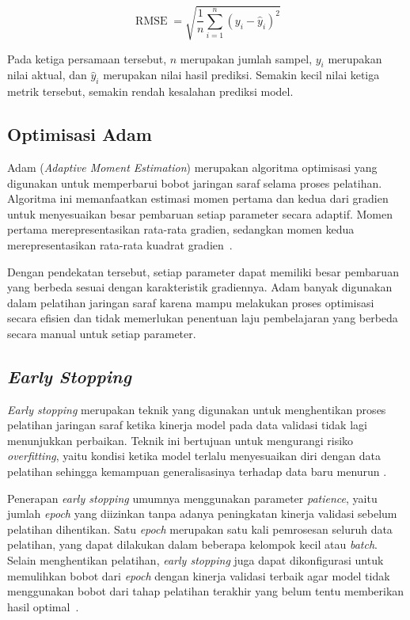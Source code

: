\documentclass[10pt,conference]{IEEEtran}
\begin{document}
\begin{equation}\label{eq:rmse}
\operatorname{RMSE}=\sqrt{\frac{1}{n}\sum_{i=1}^{n}(y_i-\hat{y}_i)^2}
\end{equation}

Pada ketiga persamaan tersebut, \(n\) merupakan jumlah sampel, \(y_i\) merupakan nilai aktual, dan \(\hat{y}_i\) merupakan nilai hasil prediksi. Semakin kecil nilai ketiga metrik tersebut, semakin rendah kesalahan prediksi model.

\subsection{Optimisasi Adam}

Adam (\textit{Adaptive Moment Estimation}) merupakan algoritma optimisasi yang digunakan untuk memperbarui bobot jaringan saraf selama proses pelatihan. Algoritma ini memanfaatkan estimasi momen pertama dan kedua dari gradien untuk menyesuaikan besar pembaruan setiap parameter secara adaptif. Momen pertama merepresentasikan rata-rata gradien, sedangkan momen kedua merepresentasikan rata-rata kuadrat gradien~\cite{adam}.

Dengan pendekatan tersebut, setiap parameter dapat memiliki besar pembaruan yang berbeda sesuai dengan karakteristik gradiennya. Adam banyak digunakan dalam pelatihan jaringan saraf karena mampu melakukan proses optimisasi secara efisien dan tidak memerlukan penentuan laju pembelajaran yang berbeda secara manual untuk setiap parameter.

\subsection{\textit{Early Stopping}}

\textit{Early stopping} merupakan teknik yang digunakan untuk menghentikan proses pelatihan jaringan saraf ketika kinerja model pada data validasi tidak lagi menunjukkan perbaikan. Teknik ini bertujuan untuk mengurangi risiko \textit{overfitting}, yaitu kondisi ketika model terlalu menyesuaikan diri dengan data pelatihan sehingga kemampuan generalisasinya terhadap data baru menurun \cite{early-stopping}.

Penerapan \textit{early stopping} umumnya menggunakan parameter \textit{patience}, yaitu jumlah \textit{epoch} yang diizinkan tanpa adanya peningkatan kinerja validasi sebelum pelatihan dihentikan. Satu \textit{epoch} merupakan satu kali pemrosesan seluruh data pelatihan, yang dapat dilakukan dalam beberapa kelompok kecil atau \textit{batch}. Selain menghentikan pelatihan, \textit{early stopping} juga dapat dikonfigurasi untuk memulihkan bobot dari \textit{epoch} dengan kinerja validasi terbaik agar model tidak menggunakan bobot dari tahap pelatihan terakhir yang belum tentu memberikan hasil optimal~\cite{early-stopping}.
\end{document}
